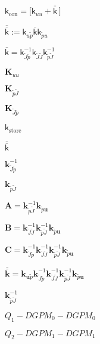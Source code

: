 \documentclass{article}
\begin{document}
$\mathbf{\mathsf{k}}_{\textrm{con}} = \bigl[ \mathbf{\mathsf{k}}_{uu} +\overline{\overline{\mathbf{\mathsf{k}}}}~ \bigr]$
\pagebreak

$ \overline{\overline{\mathbf{\mathsf{k}}}} := \mathbf{\mathsf{k}}_{u\widetilde{p}} \overline{\mathbf{\mathsf{k}}} \mathbf{\mathsf{k}}_{\widetilde{p}u} $
\pagebreak

$ \overline{\mathbf{\mathsf{k}}} = \mathbf{\mathsf{k}}_{\widetilde{J}\widetilde{p}}^{-1} \mathbf{\mathsf{k}}_{\widetilde{J}\widetilde{J}} \mathbf{\mathsf{k}}_{\widetilde{p}\widetilde{J}}^{-1} $
\pagebreak

$\mathsf{\mathbf{K}}_{uu}$
\pagebreak

$\mathsf{\mathbf{K}}_{\widetilde{p} \widetilde{J}}$
\pagebreak

$\mathsf{\mathbf{K}}_{\widetilde{J} \widetilde{p}}$
\pagebreak

$ {\mathbf{\mathsf{k}}}_{\textrm{store}}$
\pagebreak

$\overline{\overline{\mathbf{\mathsf{k}}}}$
\pagebreak

$\mathsf{\mathbf{k}}^{-1}_{\widetilde{J} \widetilde{p}}$
\pagebreak

$\mathsf{\mathbf{k}}_{ \widetilde{p} \widetilde{J}}$
\pagebreak

$ \mathsf{\mathbf{A}} = \mathsf{\mathbf{k}}^{-1}_{\widetilde{p} \widetilde{J}} \mathsf{\mathbf{k}}_{\widetilde{p} \mathbf{u}} $
\pagebreak

$ \mathsf{\mathbf{B}} = \mathsf{\mathbf{k}}^{-1}_{\widetilde{J} \widetilde{J}} \mathsf{\mathbf{k}}^{-1}_{\widetilde{p} \widetilde{J}} \mathsf{\mathbf{k}}_{\widetilde{p} \mathbf{u}} $
\pagebreak

$ \mathsf{\mathbf{C}} = \mathsf{\mathbf{k}}^{-1}_{\widetilde{J} \widetilde{p}} \mathsf{\mathbf{k}}^{-1}_{\widetilde{J} \widetilde{J}} \mathsf{\mathbf{k}}^{-1}_{\widetilde{p} \widetilde{J}} \mathsf{\mathbf{k}}_{\widetilde{p} \mathbf{u}} $
\pagebreak

$ \overline{\overline{\mathsf{\mathbf{k}}}} = \mathsf{\mathbf{k}}_{\mathbf{u} \widetilde{p}} \mathsf{\mathbf{k}}^{-1}_{\widetilde{J} \widetilde{p}} \mathsf{\mathbf{k}}^{-1}_{\widetilde{J} \widetilde{J}} \mathsf{\mathbf{k}}^{-1}_{\widetilde{p} \widetilde{J}} \mathsf{\mathbf{k}}_{\widetilde{p} \mathbf{u}} $
\pagebreak

$\mathsf{\mathbf{k}}^{-1}_{ \widetilde{p} \widetilde{J}}$
\pagebreak

$Q_1-DGPM_0-DGPM_0$
\pagebreak

$Q_2-DGPM_1-DGPM_1$
\pagebreak
\end{document}
